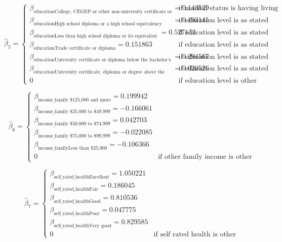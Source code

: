 \documentclass[
]{article}
\begin{document}
\begin{equation}
  \hat\beta_{5} =
    \begin{cases}
      \beta_{\text{educationCollege, CEGEP or other non-university certificate or diploma}} =  0.143529 & \text{if marital status is having living common-law partner}\\
      \beta_{\text{educationHigh school diploma or a high school equivalency certificate}} = 0.193145 & \text{if education level is as stated}\\
      \beta_{\text{educationLess than high school diploma or its equivalent }} = 0.527132  & \text{if education level is as stated}\\
      \beta_{\text{educationTrade certificate or diploma}} = 0.151863  & \text{if education level is as stated}\\
      \beta_{\text{educationUniversity certificate or diploma below the bachelor's level} } = 0.294567 & \text{if education level is as stated}\\
      \beta_{\text{educationUniversity certificate, diploma or degree above the bachelor}} = 0.020526    & \text{if education level is as stated}\\
      0 & \text{if education level is other}
    \end{cases}       
\end{equation}

\begin{equation}
  \hat\beta_{6} =
    \begin{cases}
      \beta_{\text{income_family \$125,000 and more}} =  0.199942\\
      \beta_{\text{income_family \$25,000 to \$49,999}} = -0.166061\\
      \beta_{\text{income_family \$50,000 to \$74,999}} = 0.042703\\
      \beta_{\text{income_family \$75,000 to \$99,999}} = -0.022085\\
      \beta_{\text{income_familyLess than \$25,000}} = -0.106366\\
      0 & \text{if other family income is other}
    \end{cases}       
\end{equation}

\begin{equation}
  \hat\beta_{7} =
    \begin{cases}
      \beta_{\text{self_rated_healthExcellent}} =  1.050221\\
      \beta_{\text{self_rated_healthFair}} = 0.186045 \\
      \beta_{\text{self_rated_healthGood}} = 0.810536\\
      \beta_{\text{self_rated_healthPoor}} = 0.047775\\
      \beta_{\text{self_rated_healthVery good} }=  0.829585 \\
      0 & \text{if self rated health is other}
    \end{cases}       
\end{equation}
\end{document}
